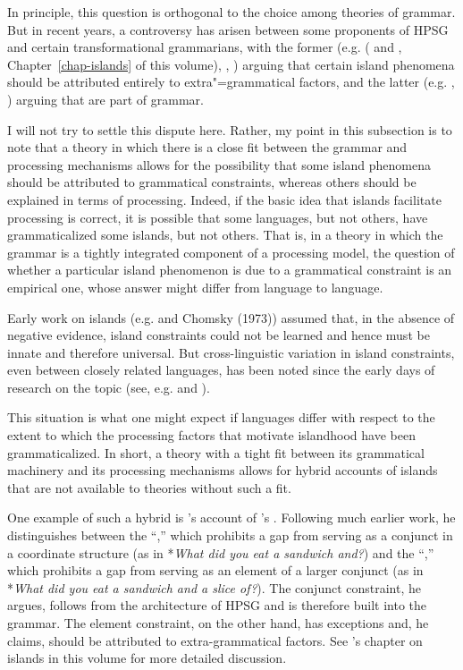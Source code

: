 \documentclass[a4paper]{article}
\begin{document}
In principle, this question is orthogonal to the choice among theories of grammar.  But in recent
years, a controversy has arisen between some proponents of HPSG and certain transformational
grammarians, with the former (e.g. \citeauthor{Chaves2012} (\citeyear{Chaves2012} and
\citeyear{chapters/islands}, Chapter~\ref{chap-islands} of this volume), \citet{HofmeisterSag2010}, \citet*{HofmeisterEtal2013}) arguing that certain island phenomena should be attributed entirely to extra"=grammatical factors, and the latter (e.g. \citet{Phillips2013}, \citet{SWP2012a-u}) arguing that  are part of grammar.

I will not try to settle this dispute here.  Rather, my point in this subsection is to note that a theory in which there is a close fit between the grammar and processing mechanisms allows for the possibility that some island phenomena should be attributed to grammatical constraints, whereas others should be explained in terms of processing.  Indeed, if the basic idea that islands facilitate processing is correct, it is possible that some languages, but not others, have grammaticalized some islands, but not others.  That is, in a theory in which the grammar is a tightly integrated component of a processing model, the question of whether a particular island phenomenon is due to a grammatical constraint is an empirical one, whose answer might differ from language to language. 

Early work on islands (e.g. \citet{Ross67} and Chomsky (1973)) assumed that, in the absence of negative evidence, island constraints could not be learned and hence must be innate and therefore universal.  But cross-linguistic variation in island constraints, even between closely related languages, has been noted since the early days of research on the topic (see, e.g. \citet{Erteschik73a-u} and \citet{EngdahlEjerhed82}).

This situation is what one might expect if languages differ with respect to the extent to which the processing factors that motivate islandhood have been grammaticalized.  In short, a theory with a tight fit between its grammatical machinery and its processing mechanisms allows for hybrid accounts of islands that are not available to theories without such a fit.

One example of such a hybrid is \citeauthor{Chaves2012}'s \citeyearpar{Chaves2012} account of \citeauthor{Ross67}'s .  Following much earlier work, he distinguishes between the ``,'' which prohibits a gap from serving as a conjunct in a coordinate structure (as in *{\it What did you eat a sandwich and?}) and the ``,'' which prohibits a gap from serving as an element of a larger conjunct (as in *{\it What did you eat a sandwich and a slice of?}).  The conjunct constraint, he argues, follows from the architecture of HPSG and is therefore built into the grammar.  The element constraint, on the other hand, has exceptions and, he claims, should be attributed to extra-grammatical factors.  See \citeauthor{Chaves2012}'s chapter on islands in this volume for more detailed discussion. 
\end{document}
